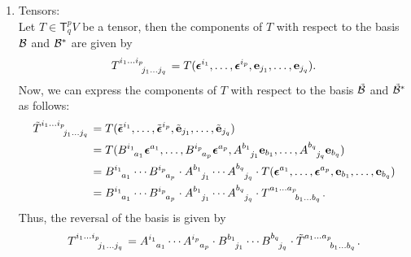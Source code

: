 \begin{enumerate}[resume]
    \item \textsf{Tensors:}\\
          Let \(T \in \mathsf{T}^p_q V\) be a tensor, then the components of \(T\) with respect to the basis \(\mathcal B\) and \(\mathcal B^*\) are given by
          \begin{equation}
              \tensor{T}{^{i_1 \ldots i_p}_{j_1 \ldots j_q}} = T(\vb*{\epsilon}^{i_1}, \ldots, \vb*{\epsilon}^{i_p}, \vb{e}_{j_1}, \ldots, \vb{e}_{j_q}).
          \end{equation}
          Now, we can express the components of \(T\) with respect to the basis \(\tilde{\mathcal B}\) and \(\tilde{\mathcal B}^*\) as follows:
          \begin{align}
              \tensor{\tilde{T}}{^{i_1 \ldots i_p}_{j_1 \ldots j_q}} & = T(\tilde{\vb*{\epsilon}}^{i_1}, \ldots, \tilde{\vb*{\epsilon}}^{i_p}, \tilde{\vb{e}}_{j_1}, \ldots, \tilde{\vb{e}}_{j_q})                                                                                               \\
                                                                     & = T(\tensor{B}{^{i_1}_{a_1}} \vb*{\epsilon}^{a_1}, \ldots, \tensor{B}{^{i_p}_{a_p}} \vb*{\epsilon}^{a_p}, \tensor{A}{^{b_1}_{j_1}} \vb{e}_{b_1}, \ldots, \tensor{A}{^{b_q}_{j_q}} \vb{e}_{b_q})                           \\
                                                                     & = \tensor{B}{^{i_1}_{a_1}} \cdots \tensor{B}{^{i_p}_{a_p}} \cdot \tensor{A}{^{b_1}_{j_1}} \cdots \tensor{A}{^{b_q}_{j_q}} \cdot T(\vb*{\epsilon}^{a_1}, \ldots, \vb*{\epsilon}^{a_p}, \vb{e}_{b_1}, \ldots, \vb{e}_{b_q}) \\
                                                                     & = \tensor{B}{^{i_1}_{a_1}} \cdots \tensor{B}{^{i_p}_{a_p}} \cdot \tensor{A}{^{b_1}_{j_1}} \cdots \tensor{A}{^{b_q}_{j_q}} \cdot \tensor{T}{^{a_1 \ldots a_p}_{b_1 \ldots b_q}}.
          \end{align}
          Thus, the reversal of the basis is given by
          \begin{equation}
              \tensor{T}{^{i_1 \ldots i_p}_{j_1 \ldots j_q}} = \tensor{A}{^{i_1}_{a_1}} \cdots \tensor{A}{^{i_p}_{a_p}} \cdot \tensor{B}{^{b_1}_{j_1}} \cdots \tensor{B}{^{b_q}_{j_q}} \cdot \tensor{\tilde{T}}{^{a_1 \ldots a_p}_{b_1 \ldots b_q}}.
          \end{equation}
\end{enumerate}

